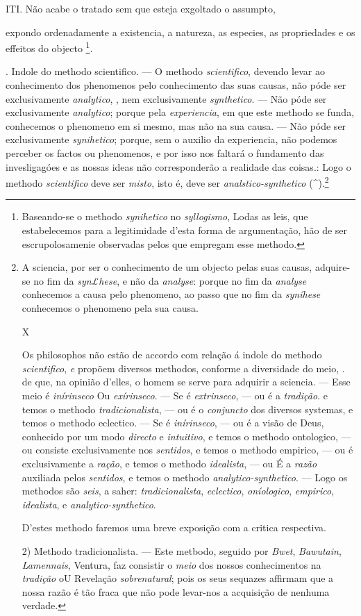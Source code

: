 ITI. Não acabe o tratado sem que esteja exgoltado o assumpto,

expondo ordenadamente a existencia, a natureza, as especies, as propriedades e os effeitos do objecto \footnote{Baseando-se o methodo \emph{synihetico} no \emph{syllogismo}, Lodas as leis, que estabelecemos para a legitimidade d'esta forma de argumentação, hão de ser escrupolosamenie observadas pelos que empregam esse methodo.}.

. Indole do methodo scientifico. --- O methodo \emph{scientifico}, devendo levar ao conhecimento dos phenomenos pelo conhecimento das suas causas, não póde ser exclusivamente \emph{analytico}, , nem exclusivamente \emph{synthetico}. --- Não póde ser exclusivamente \emph{analytico}; porque pela \emph{experiencia}, em que este methodo se funda, conhecemos o phenomeno em si mesmo, mas não na sua causa. --- Não póde ser exclusivamente \emph{synihetico}; porque, sem o auxilio da experiencia, não podemos perceber os factos ou phenomenos, e por isso nos faltará o fundamento das invesligagóes e as nossas ideas não corresponderão a realidade das coisas.: Logo o methodo \emph{scientifico} deve ser \emph{misto}, isto é, deve ser \emph{analstico-synthetico} (\textasciicircum{}).\footnote{A sciencia, por ser o conhecimento de um objecto pelas suas causas, adquire-se no fim da \emph{syn£hese}, e não da \emph{analyse}: porque no fim da \emph{analyse} conhecemos a causa pelo phenomeno, ao passo que no fim da \emph{syníhese} conhecemos o phenomeno pela sua causa.\par X\par Os philosophos não estão de accordo com relação á indole do methodo \emph{scientifico}, \emph{e} propõem diversos methodos, conforme a diversidade do meio, . de que, na opinião d'elles, o homem se serve para adquirir a sciencia. --- Esse meio é \emph{inírinseco} Ou \emph{exírinseco}. --- Se é \emph{extrinseco}, --- ou é a \emph{tradição}. e temos o methodo \emph{tradicionalista}, --- ou é o \emph{conjuncto} dos diversos systemas, e temos o methodo eclectico. --- Se é \emph{inírinseco}, --- ou é a visão de Deus, conhecido por um modo \emph{directo} e \emph{intuitivo}, e temos o methodo ontologico, --- ou consiste exclusivamente nos \emph{sentidos}, e temos o methodo empirico, --- ou é exclusivamente a \emph{ração}, e temos o methodo \emph{idealista}, --- ou É a \emph{razão} auxiliada pelos \emph{sentidos}, e temos o methodo \emph{analytico-synthetico}. --- Logo os methodos são \emph{seis}, a saher: \emph{tradicionalista}, \emph{eclectico}, \emph{oníologico}, \emph{empirico}, \emph{idealista}, e \emph{analytico-synthetico}.\par D'estes methodo faremos uma breve exposição com a critica respectiva.\par 2) Methodo tradicionalista. --- Este metbodo, seguido por \emph{Bwet}, \emph{Bawutain}, \textbar{} \emph{Lamennais}, Ventura, faz consistir o \emph{meio} dos nossos conhecimentos na \emph{tradição} oU Revelação \emph{sobrenatural}; pois os seus sequazes affirmam que a nossa razão é tão fraca que não pode levar-nos a acquisição de nenhuma verdade.}


